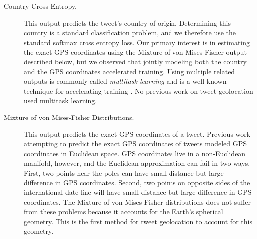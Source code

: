 \documentclass[sigconf,anonymous,review]{acmart}
\newcommand{\defn}[1]{\textit{#1}}
\begin{document}
\begin{description}

    \item[Country Cross Entropy.]
        This output predicts the tweet's country of origin.
        Determining this country is a standard classification problem,
        and we therefore use the standard softmax cross entropy loss.
        Our primary interest is in estimating the exact GPS coordinates using the Mixture of von Mises-Fisher output described below,
        but we observed that jointly modeling both the country and the GPS coordinates accelerated training.
        Using multiple related outputs is commonly called \defn{multitask learning} and is a well known technique for accelerating training \citep{zhang2017survey}.
        No previous work on tweet geolocation used multitask learning.

    \item[Mixture of von Mises-Fisher Distributions.]


        This output predicts the exact GPS coordinates of a tweet.
        Previous work attempting to predict the exact GPS coordinates of tweets \citep{duong2016near} modeled GPS coordinates in Euclidean space.
        GPS coordinates live in a non-Euclidean manifold, however, and the Euclidean approximation can fail in two ways.
        First, two points near the poles can have small distance but large difference in GPS coordinates.
        Second, two points on opposite sides of the international date line will have small distance but large difference in GPS coordinates.
        The Mixture of von-Mises Fisher distributions does not suffer from these problems because it accounts for the Earth's spherical geometry.
        This is the first method for tweet geolocation to account for this geometry.


\end{description}
\end{document}
